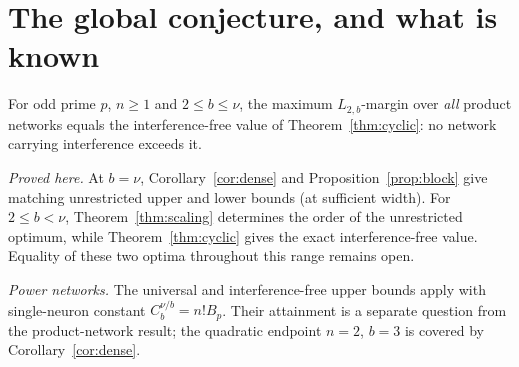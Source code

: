 \section{The global conjecture, and what is known}\label{app:conjecture}

\begin{conjecture}
For odd prime $p$, $n\ge1$ and $2\le b\le\nu$, the maximum $L_{2,b}$-margin over \emph{all} product networks equals the interference-free value of Theorem~\ref{thm:cyclic}: no network carrying interference exceeds it.
\end{conjecture}

\emph{Proved here.} At $b=\nu$, Corollary~\ref{cor:dense} and Proposition~\ref{prop:block} give matching unrestricted upper and lower bounds (at sufficient width). For $2\le b<\nu$, Theorem~\ref{thm:scaling} determines the order of the unrestricted optimum, while Theorem~\ref{thm:cyclic} gives the exact interference-free value. Equality of these two optima throughout this range remains open.

\emph{Power networks.} The universal and interference-free upper bounds apply with single-neuron constant $C_b^{\nu/b}=n!B_p$. Their attainment is a separate question from the product-network result; the quadratic endpoint $n=2$, $b=3$ is covered by Corollary~\ref{cor:dense}.

% 
% 
% 

